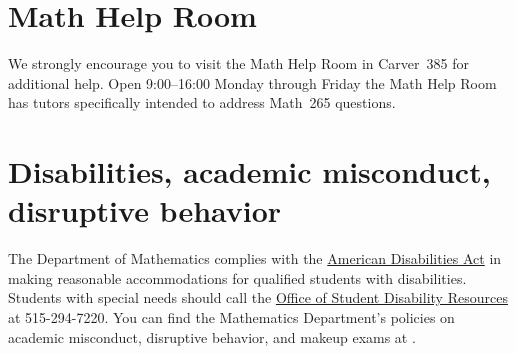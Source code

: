 \documentclass[11pt]{article}
\begin{document}
\section{Math Help Room}\label{MathCenter}
We strongly encourage you to visit the Math Help Room
in Carver~385 for additional help.
Open 9:00--16:00 Monday through Friday the Math Help Room
has tutors specifically intended to address Math~265 questions.

\section{Disabilities, academic misconduct, disruptive behavior}
The Department of Mathematics complies with the 
\href{http://www.ada.gov}{American Disabilities Act} in making reasonable 
accommodations for qualified students with disabilities.  Students with 
special needs should call the 
\href{http://www.dso.iastate.edu/dr}{Office of Student Disability Resources} at
515-294-7220.
You can find the Mathematics Department's policies on 
academic misconduct, disruptive behavior, and makeup exams at
.
\end{document}
